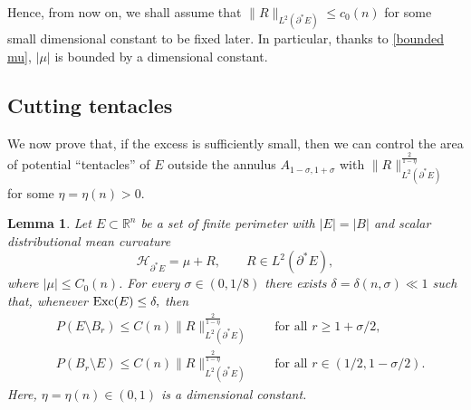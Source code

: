 \documentclass[reqno,11pt]{amsart}
\makeatletter
\def\sz{\sigma}
\newtheorem{lem}[thm]{Lemma}%
\numberwithin{equation}{section}
\theoremstyle{remark}
\makeatother
\begin{document}
Hence, from now on, we shall assume that $\|R\|_{L^2(\partial^*E)} \leq c_0(n)$ for some small dimensional constant to be fixed later. In particular, thanks to \eqref{bounded mu}, $|\mu|$ is bounded by a dimensional constant.


\subsection{Cutting tentacles}


We now prove that, if the excess is sufficiently small, then we can control the area of potential ``tentacles'' of $E$ outside the annulus $A_{1-\sigma,1+\sigma}$ with $\|R\|_{L^2(\partial^*E)}^{\frac{2}{1-\eta}}$ for some $\eta=\eta(n)>0$.


\begin{lem}\label{small tentacle}
Let $E\subset\mathbb R^n$ be a set of finite perimeter with $|E|=|B|$ and
scalar distributional mean curvature
\[
\mathcal H_{\partial^*E}=\mu+R,\qquad R\in L^2(\partial^*E),
\]
where $|\mu|\le C_0(n)$. For every $\sz \in (0,1/8)$ there exists
$\delta=\delta(n,\sz)\ll 1$ such that, whenever ${\rm Exc}(E)\le \delta,$
then
\begin{align*}
&P(E\setminus B_{r})\le C(n)\|R\|_{L^2(\partial^*E)}^{\frac{2}{1-\eta}} \qquad \text{for all }r \geq 1+\sigma/2,\\
&P(B_r\setminus E)\le C(n)\|R\|_{L^2(\partial^*E)}^{\frac{2}{1-\eta}} \qquad \text{for all }r \in (1/2,1-\sigma/2).
\end{align*}
Here, $\eta=\eta(n) \in (0,1)$ is a dimensional constant.
\end{lem}
\end{document}
